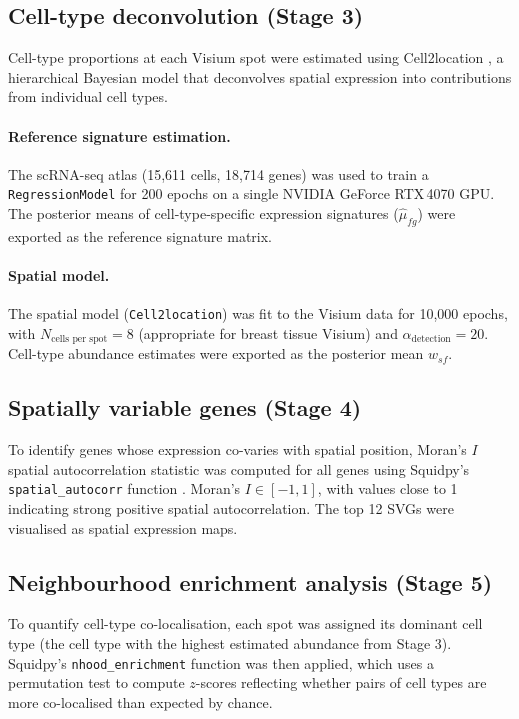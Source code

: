 \documentclass[12pt, a4paper]{article}
\begin{document}
\subsection{Cell-type deconvolution (Stage 3)}

Cell-type proportions at each Visium spot were estimated using Cell2location \citep{kleshchevnikov2022}, a hierarchical Bayesian model that deconvolves spatial expression into contributions from individual cell types.

\paragraph{Reference signature estimation.} The scRNA-seq atlas (15,611 cells, 18,714 genes) was used to train a \texttt{RegressionModel} for 200 epochs on a single NVIDIA GeForce RTX\,4070 GPU. The posterior means of cell-type-specific expression signatures ($\hat{\mu}_{fg}$) were exported as the reference signature matrix.

\paragraph{Spatial model.} The spatial model (\texttt{Cell2location}) was fit to the Visium data for 10,000 epochs, with $N_{\text{cells per spot}} = 8$ (appropriate for breast tissue Visium) and $\alpha_{\text{detection}} = 20$. Cell-type abundance estimates were exported as the posterior mean $w_{sf}$.

\subsection{Spatially variable genes (Stage 4)}

To identify genes whose expression co-varies with spatial position, Moran's $I$ spatial autocorrelation statistic was computed for all genes using Squidpy's \texttt{spatial\_autocorr} function \citep{moran1950}. Moran's $I \in [-1, 1]$, with values close to 1 indicating strong positive spatial autocorrelation. The top 12 SVGs were visualised as spatial expression maps.

\subsection{Neighbourhood enrichment analysis (Stage 5)}

To quantify cell-type co-localisation, each spot was assigned its dominant cell type (the cell type with the highest estimated abundance from Stage 3). Squidpy's \texttt{nhood\_enrichment} function was then applied, which uses a permutation test to compute $z$-scores reflecting whether pairs of cell types are more co-localised than expected by chance.
\end{document}
